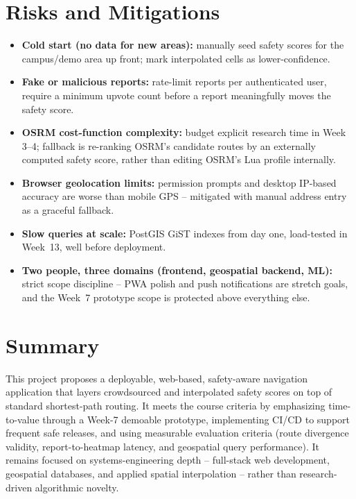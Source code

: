 \documentclass[11pt,a4paper]{article}
\begin{document}
\section{Risks and Mitigations}
\begin{itemize}[leftmargin=0.7cm]
    \item \textbf{Cold start (no data for new areas):} manually
    seed safety scores for the campus/demo area up front; mark
    interpolated cells as lower-confidence.
    \item \textbf{Fake or malicious reports:} rate-limit reports
    per authenticated user, require a minimum upvote count before
    a report meaningfully moves the safety score.
    \item \textbf{OSRM cost-function complexity:} budget explicit
    research time in Week 3--4; fallback is re-ranking OSRM's
    candidate routes by an externally computed safety score,
    rather than editing OSRM's Lua profile internally.
    \item \textbf{Browser geolocation limits:} permission prompts
    and desktop IP-based accuracy are worse than mobile GPS --
    mitigated with manual address entry as a graceful fallback.
    \item \textbf{Slow queries at scale:} PostGIS GiST indexes from
    day one, load-tested in Week~13, well before deployment.
    \item \textbf{Two people, three domains (frontend, geospatial
    backend, ML):} strict scope discipline -- PWA polish and push
    notifications are stretch goals, and the Week~7 prototype
    scope is protected above everything else.
\end{itemize}

\section{Summary}
This project proposes a deployable, web-based, safety-aware
navigation application that layers crowdsourced and interpolated
safety scores on top of standard shortest-path routing. It meets
the course criteria by emphasizing time-to-value through a Week-7
demoable prototype, implementing CI/CD to support frequent safe
releases, and using measurable evaluation criteria (route
divergence validity, report-to-heatmap latency, and geospatial
query performance). It remains focused on systems-engineering
depth -- full-stack web development, geospatial databases, and
applied spatial interpolation -- rather than research-driven
algorithmic novelty.
\end{document}
